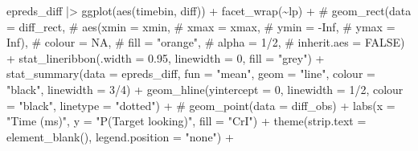 \documentclass[
  letterpaper,
  DIV=11,
  numbers=noendperiod]{scrartcl}
\newenvironment{Shaded}{\begin{snugshade}}{\end{snugshade}}
\newcommand{\AttributeTok}[1]{\textcolor[rgb]{0.40,0.45,0.13}{#1}}
\newcommand{\CommentTok}[1]{\textcolor[rgb]{0.37,0.37,0.37}{#1}}
\newcommand{\DecValTok}[1]{\textcolor[rgb]{0.68,0.00,0.00}{#1}}
\newcommand{\FloatTok}[1]{\textcolor[rgb]{0.68,0.00,0.00}{#1}}
\newcommand{\FunctionTok}[1]{\textcolor[rgb]{0.28,0.35,0.67}{#1}}
\newcommand{\NormalTok}[1]{\textcolor[rgb]{0.00,0.23,0.31}{#1}}
\newcommand{\SpecialCharTok}[1]{\textcolor[rgb]{0.37,0.37,0.37}{#1}}
\newcommand{\StringTok}[1]{\textcolor[rgb]{0.13,0.47,0.30}{#1}}
\begin{document}
\begin{Shaded}
\begin{Highlighting}[]
\NormalTok{    epreds\_diff }\SpecialCharTok{|\textgreater{}} 
    \FunctionTok{ggplot}\NormalTok{(}\FunctionTok{aes}\NormalTok{(timebin, diff)) }\SpecialCharTok{+}
    \FunctionTok{facet\_wrap}\NormalTok{(}\SpecialCharTok{\textasciitilde{}}\NormalTok{lp) }\SpecialCharTok{+}
    \CommentTok{\# geom\_rect(data = diff\_rect,}
    \CommentTok{\#         aes(xmin = xmin,}
    \CommentTok{\#           xmax = xmax,}
    \CommentTok{\#           ymin = {-}Inf,}
    \CommentTok{\#           ymax = Inf),}
    \CommentTok{\#         colour = NA,}
    \CommentTok{\#         fill = "orange",}
    \CommentTok{\#         alpha = 1/2,}
    \CommentTok{\#         inherit.aes = FALSE) +}
    \FunctionTok{stat\_lineribbon}\NormalTok{(}\AttributeTok{.width =} \FloatTok{0.95}\NormalTok{,}
                    \AttributeTok{linewidth =} \DecValTok{0}\NormalTok{,}
                    \AttributeTok{fill =} \StringTok{"grey"}\NormalTok{) }\SpecialCharTok{+}
    \FunctionTok{stat\_summary}\NormalTok{(}\AttributeTok{data =}\NormalTok{ epreds\_diff,}
                 \AttributeTok{fun =} \StringTok{"mean"}\NormalTok{,}
                 \AttributeTok{geom =} \StringTok{"line"}\NormalTok{,}
                 \AttributeTok{colour =} \StringTok{"black"}\NormalTok{,}
                 \AttributeTok{linewidth =} \DecValTok{3}\SpecialCharTok{/}\DecValTok{4}\NormalTok{) }\SpecialCharTok{+}
    \FunctionTok{geom\_hline}\NormalTok{(}\AttributeTok{yintercept =} \DecValTok{0}\NormalTok{, }
               \AttributeTok{linewidth =} \DecValTok{1}\SpecialCharTok{/}\DecValTok{2}\NormalTok{,}
               \AttributeTok{colour =} \StringTok{"black"}\NormalTok{,}
               \AttributeTok{linetype =} \StringTok{"dotted"}\NormalTok{) }\SpecialCharTok{+}
    \CommentTok{\# geom\_point(data = diff\_obs) +}
    \FunctionTok{labs}\NormalTok{(}\AttributeTok{x =} \StringTok{"Time (ms)"}\NormalTok{,}
         \AttributeTok{y =} \StringTok{"P(Target looking)"}\NormalTok{,}
         \AttributeTok{fill =} \StringTok{"CrI"}\NormalTok{) }\SpecialCharTok{+}
    \FunctionTok{theme}\NormalTok{(}\AttributeTok{strip.text =} \FunctionTok{element\_blank}\NormalTok{(),}
          \AttributeTok{legend.position =} \StringTok{"none"}\NormalTok{) }\SpecialCharTok{+}
    

\end{Highlighting}
\end{Shaded}
\end{document}
